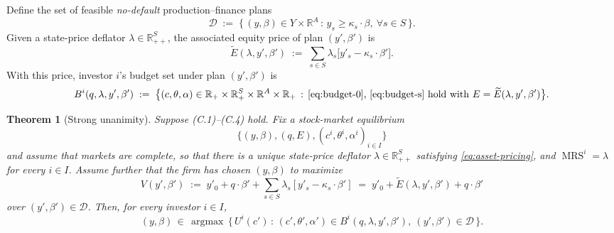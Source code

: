 \documentclass[11pt,a4paper]{article}
\def\R{\mathbb{R}}
\def\geq{\geqslant}
\DeclareMathOperator*{\argmax}{argmax}
\DeclareMathOperator{\MRS}{MRS}
\theoremstyle{plain}
\newtheorem{theorem}{Theorem}[section]
\theoremstyle{definition}
\theoremstyle{remark}
\begin{document}
Define the set of feasible \emph{no-default} production--finance plans
\begin{equation}\label{eq:feasible-set}
  \mathcal{D} \;:=\; \bigl\{\,(y,\beta) \in Y\times\R^A \,:\, y_s \geq \kappa_s\cdot\beta,\ \forall s\in S\,\bigr\}.
\end{equation}
Given a state-price deflator $\lambda\in\R^S_{++}$, the associated equity price of plan $(y',\beta')$ is
\begin{equation}\label{eq:tilde-E}
  \widetilde{E}(\lambda,y',\beta') \;:=\; \sum_{s\in S}\lambda_s\bigl[y'_s - \kappa_s\cdot\beta'\bigr].
\end{equation}
With this price, investor $i$'s budget set under plan $(y',\beta')$ is
\[
  B^i(q,\lambda,y',\beta')
  \;:=\;
  \bigl\{(c,\theta,\alpha)\in\R_+\times\R_+^S\times\R^A\times\R_+\,:\,\text{\eqref{eq:budget-0}, \eqref{eq:budget-s} hold with }E=\widetilde{E}(\lambda,y',\beta')\bigr\}.
\]

\begin{theorem}[Strong unanimity]\label{thm:strong-unanimity}
Suppose \textup{(C.1)--(C.4)} hold. Fix a stock-market equilibrium
\[
  \bigl\{(y,\beta),(q,E),(c^i,\theta^i,\alpha^i)_{i\in I}\bigr\}
\]
and assume that markets are complete, so that there is a unique state-price deflator $\lambda\in\R^S_{++}$ satisfying \eqref{eq:asset-pricing}, and $\MRS^i = \lambda$ for every $i\in I$. Assume further that the firm has chosen $(y,\beta)$ to maximize
\[
  V(y',\beta') \;:=\; y'_0 + q\cdot\beta' + \sum_{s\in S}\lambda_s[y'_s - \kappa_s\cdot\beta']
  \;=\; y'_0 + \widetilde{E}(\lambda,y',\beta') + q\cdot\beta'
\]
over $(y',\beta')\in\mathcal{D}$. Then, for every investor $i\in I$,
\begin{equation}\label{eq:strong-unanimity}
  (y,\beta)\,\in\,\argmax\,\bigl\{\,U^i(c')\,:\,(c',\theta',\alpha')\in B^i(q,\lambda,y',\beta'),\ (y',\beta')\in\mathcal{D}\,\bigr\}.
\end{equation}
\end{theorem}
\end{document}
